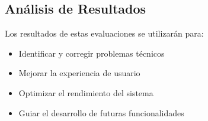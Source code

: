 \subsection{Análisis de Resultados}

Los resultados de estas evaluaciones se utilizarán para:

\begin{itemize}
	\item Identificar y corregir problemas técnicos
	\item Mejorar la experiencia de usuario
	\item Optimizar el rendimiento del sistema
	\item Guiar el desarrollo de futuras funcionalidades
\end{itemize}